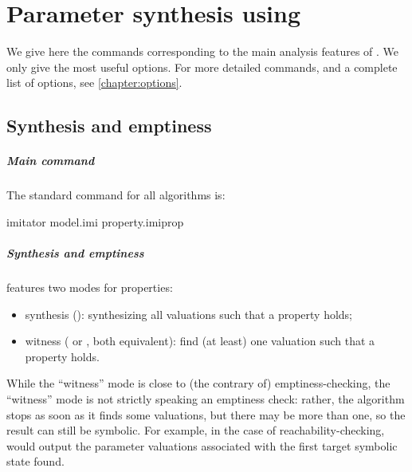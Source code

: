 \chapter{Parameter synthesis using \imitator{}}


We give here the commands corresponding to the main analysis features of \imitator{}.
We only give the most useful options.
For more detailed commands, and a complete list of options, see \cref{chapter:options}.

\section{Synthesis and emptiness}

\paragraph{Main command}
The standard \imitator{} command for all algorithms is:

\begin{terminal}
imitator model.imi property.imiprop
\end{terminal}

\paragraph{Synthesis and emptiness}
\imitator{} features two modes for properties:

\begin{itemize}
	\item synthesis (): synthesizing all valuations such that a property holds;
	\item witness ( or , both equivalent): find (at least) one valuation such that a property holds.
\end{itemize}

While the ``witness'' mode is close to (the contrary of) emptiness-checking, the ``witness'' mode is not strictly speaking an emptiness check: rather, the algorithm stops as soon as it finds some valuations, but there may be more than one, so the result can still be symbolic.
For example, in the case of reachability-checking, \imitator{} would output the parameter valuations associated with the first target symbolic state found.


